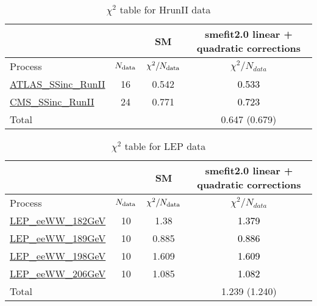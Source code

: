 \documentclass{article}
\begin{document}
\begin{table}[H]
\centering
\begin{tabular}{|l|c|c|c|}
\hline
 \multicolumn{2}{|c|}{} & SM& smefit2.0 linear + quadratic corrections\\ \hline
Process & $N_{\rm data}$ & $\chi^ 2/N_{\rm data}$& $\chi^ 2/N_{data}$\\ \hline
\href{https://arxiv.org/abs/1909.02845}{ATLAS_SSinc_RunII} & 16 & 0.542 & \textcolor{black}                            {0.533} \\ \hline
\href{https://arxiv.org/abs/1809.10733}{CMS_SSinc_RunII} & 24 & 0.771 & \textcolor{black}                            {0.723} \\ \hline
\hline Total & &  & 0.647 (0.679) \\ \hline
\end{tabular}
\caption{$\chi^2$ table for HrunII data}
\end{table}
\begin{table}[H]
\centering
\begin{tabular}{|l|c|c|c|}
\hline
 \multicolumn{2}{|c|}{} & SM& smefit2.0 linear + quadratic corrections\\ \hline
Process & $N_{\rm data}$ & $\chi^ 2/N_{\rm data}$& $\chi^ 2/N_{data}$\\ \hline
\href{https://arxiv.org/abs/1302.3415}{LEP_eeWW_182GeV} & 10 & 1.38 & \textcolor{black}                            {1.379} \\ \hline
\href{https://arxiv.org/abs/1302.3415}{LEP_eeWW_189GeV} & 10 & 0.885 & \textcolor{black}                            {0.886} \\ \hline
\href{https://arxiv.org/abs/1302.3415}{LEP_eeWW_198GeV} & 10 & 1.609 & \textcolor{black}                            {1.609} \\ \hline
\href{https://arxiv.org/abs/1302.3415}{LEP_eeWW_206GeV} & 10 & 1.085 & \textcolor{black}                            {1.082} \\ \hline
\hline Total & &  & 1.239 (1.240) \\ \hline
\end{tabular}
\caption{$\chi^2$ table for LEP data}
\end{table}
\end{document}
